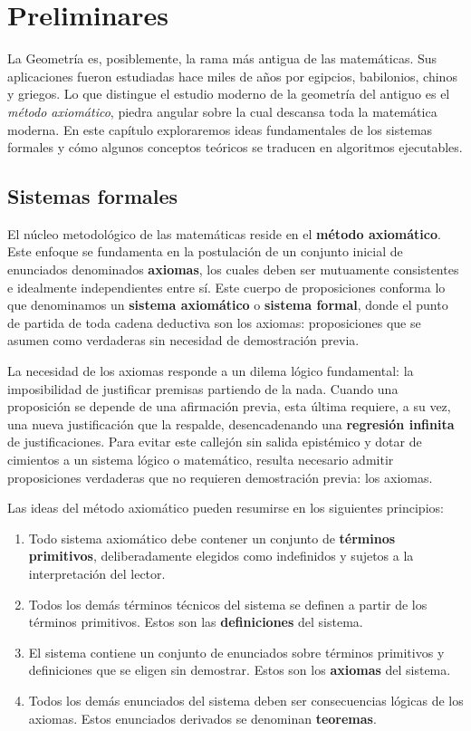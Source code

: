 \chapter{Preliminares}
\label{chap:preliminares}

La Geometría es, posiblemente, la rama más antigua de las matemáticas. Sus aplicaciones fueron estudiadas hace miles de
años por egipcios, babilonios, chinos y griegos. Lo que distingue el estudio moderno de la geometría del antiguo es el
\emph{método axiomático}, piedra angular sobre la cual descansa toda la matemática moderna. En este capítulo
exploraremos ideas fundamentales de los sistemas formales y cómo algunos conceptos teóricos se traducen en algoritmos
ejecutables.

\section{Sistemas formales}

El núcleo metodológico de las matemáticas reside en el \textbf{método axiomático}. Este enfoque se fundamenta en la
postulación de un conjunto inicial de enunciados denominados \textbf{axiomas}, los cuales deben ser mutuamente
consistentes e idealmente independientes entre sí. Este cuerpo de proposiciones conforma lo que denominamos un
\textbf{sistema axiomático} o \textbf{sistema formal}, donde el punto de partida de toda cadena deductiva son los
axiomas: proposiciones que se asumen como verdaderas sin necesidad de demostración previa.

La necesidad de los axiomas responde a un dilema lógico fundamental: la imposibilidad de justificar premisas partiendo
de la nada. Cuando una proposición se depende de una afirmación previa, esta última requiere, a su vez, una nueva
justificación que la respalde, desencadenando una \textbf{regresión infinita} de justificaciones. Para evitar este
callejón sin salida epistémico y dotar de cimientos a un sistema lógico o matemático, resulta necesario admitir
proposiciones verdaderas que no requieren demostración previa: los axiomas.

Las ideas del método axiomático pueden resumirse en los siguientes principios:
\begin{enumerate}
    \item Todo sistema axiomático debe contener un conjunto de \textbf{términos primitivos}, deliberadamente elegidos como
          indefinidos y sujetos a la interpretación del lector.
    \item Todos los demás términos técnicos del sistema se definen a partir de los términos primitivos. Estos son las
          \textbf{definiciones} del sistema.
    \item El sistema contiene un conjunto de enunciados sobre términos primitivos y definiciones que se eligen sin demostrar.
          Estos son los \textbf{axiomas} del sistema.
    \item Todos los demás enunciados del sistema deben ser consecuencias lógicas de los axiomas. Estos enunciados derivados se
          denominan \textbf{teoremas}.
\end{enumerate}

